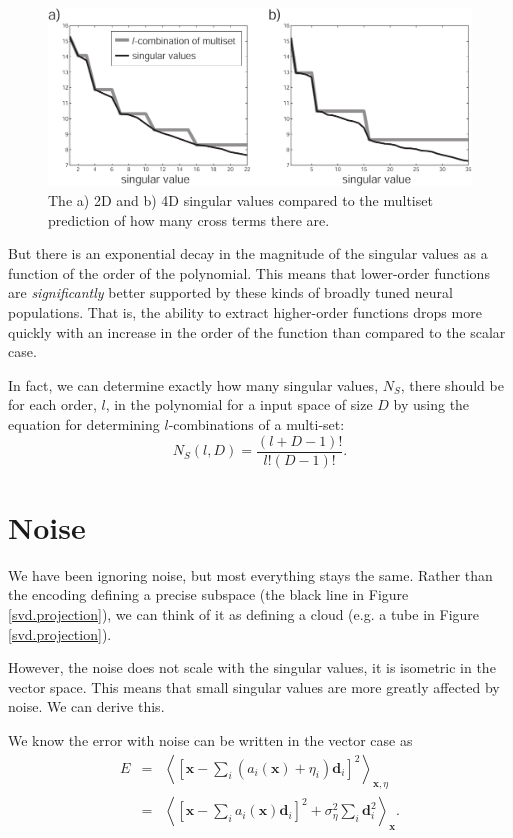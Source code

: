 \documentclass[10pt,letterpaper,oneside]{article}
\begin{document}
\begin{figure}[t]
  \centering
  \includegraphics{media/c5.multiset.2D.pdf}
  \caption{The a) 2D and b) 4D singular values compared to the multiset prediction of how many cross terms there are.}
	\label{2d.singular.values}
\end{figure}

But there is an exponential decay in the magnitude of the singular
values as a function of the order of the polynomial. This means that
lower-order functions are \emph{significantly} better supported by
these kinds of broadly tuned neural populations. That is, the ability
to extract higher-order functions drops more quickly with an increase
in the order of the function than compared to the scalar case.

In fact, we can determine exactly how many singular values, $N_{S}$,
there should be for each order, $l$, in the polynomial for a input
space of size $D$ by using the equation for determining $l$-combinations
of a multi-set:
\begin{equation}
N_{S}(l,D)=\frac{(l+D-1)!}{l!(D-1)!}.\label{c5.eq.combinations}
\end{equation}

\section{Noise}

We have been ignoring noise, but most everything stays the same. Rather
than the encoding defining a precise subspace (the black line in Figure \ref{svd.projection}), we can think of it as defining a cloud (e.g. a
tube in Figure \ref{svd.projection}).

However, the noise does not scale with the singular values, it is isometric
in the vector space. This means that small singular values are more
greatly affected by noise. We can derive this.

We know the error with noise can be written in the vector case as
\begin{eqnarray}
E & = & \left\langle \left[\mathbf{x}-\sum_{i}\left(a_{i}(\mathbf{x})+\eta_{i}\right)\mathbf{d}_{i}\right]^{2}\right\rangle _{\mathbf{x},\eta}\nonumber \\
 & = & \left\langle \left[\mathbf{x}-\sum_{i}a_{i}(\mathbf{x})\mathbf{d}_{i}\right]^{2}+\sigma_{\eta}^{2}\sum_{i}\mathbf{d}_{i}^{2}\right\rangle _{\mathbf{x}}.\label{AH.eq.error}
\end{eqnarray}
\end{document}
